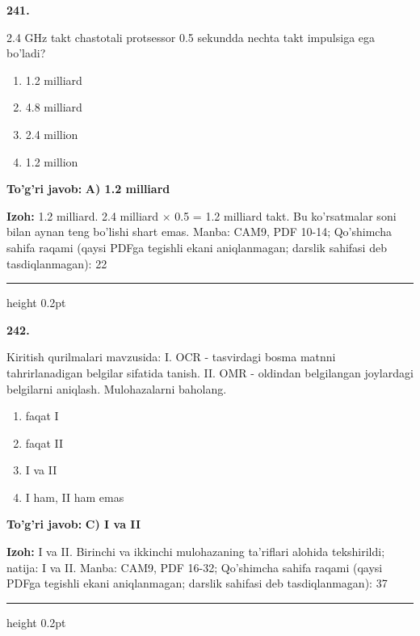\documentclass[10pt,a4paper]{article}
\begin{document}
{\bfseries\sffamily\color{ink} 241.}
\par
2.4 GHz takt chastotali protsessor 0.5 sekundda nechta takt impulsiga ega bo'ladi?
\begin{enumerate}[label=\Alph*),leftmargin=9mm]
\item 1.2 milliard
\item 4.8 milliard
\item 2.4 million
\item 1.2 million
\end{enumerate}
\begin{tcolorbox}[enhanced,breakable,colback=teal!4,colframe=teal!60!black,boxrule=0.45pt,arc=1.2mm,left=2.7mm,right=2.7mm,top=1.8mm,bottom=1.8mm,before skip=2mm,after skip=2mm]
{\bfseries\sffamily\color{teal}To'g'ri javob:} \textbf{A) 1.2 milliard}
\par\smallskip
{\bfseries Izoh:} 1.2 milliard. 2.4 milliard \ensuremath{\times} 0.5 = 1.2 milliard takt. Bu ko'rsatmalar soni bilan aynan teng bo'lishi shart emas. Manba: CAM9, PDF 10-14; Qo'shimcha sahifa raqami (qaysi PDFga tegishli ekani aniqlanmagan; darslik sahifasi deb tasdiqlanmagan): 22
\end{tcolorbox}
\vspace{2mm}\hrule height 0.2pt\vspace{3mm}

{\bfseries\sffamily\color{ink} 242.}
\par
Kiritish qurilmalari mavzusida: I. OCR - tasvirdagi bosma matnni tahrirlanadigan belgilar sifatida tanish. II. OMR - oldindan belgilangan joylardagi belgilarni aniqlash. Mulohazalarni baholang.
\begin{enumerate}[label=\Alph*),leftmargin=9mm]
\item faqat I
\item faqat II
\item I va II
\item I ham, II ham emas
\end{enumerate}
\begin{tcolorbox}[enhanced,breakable,colback=teal!4,colframe=teal!60!black,boxrule=0.45pt,arc=1.2mm,left=2.7mm,right=2.7mm,top=1.8mm,bottom=1.8mm,before skip=2mm,after skip=2mm]
{\bfseries\sffamily\color{teal}To'g'ri javob:} \textbf{C) I va II}
\par\smallskip
{\bfseries Izoh:} I va II. Birinchi va ikkinchi mulohazaning ta'riflari alohida tekshirildi; natija: I va II. Manba: CAM9, PDF 16-32; Qo'shimcha sahifa raqami (qaysi PDFga tegishli ekani aniqlanmagan; darslik sahifasi deb tasdiqlanmagan): 37
\end{tcolorbox}
\vspace{2mm}\hrule height 0.2pt\vspace{3mm}
\end{document}
